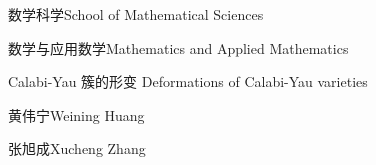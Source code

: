 
\school
{数学科学}{School of Mathematical Sciences}

\major
{数学与应用数学}{Mathematics and Applied Mathematics
}

\thesistitle
{Calabi-Yau 簇的形变}
{}
{Deformations of Calabi-Yau varieties}
{}

\thesisauthor
{黄伟宁}{Weining Huang}

\teacher
{张旭成}{Xucheng Zhang}






